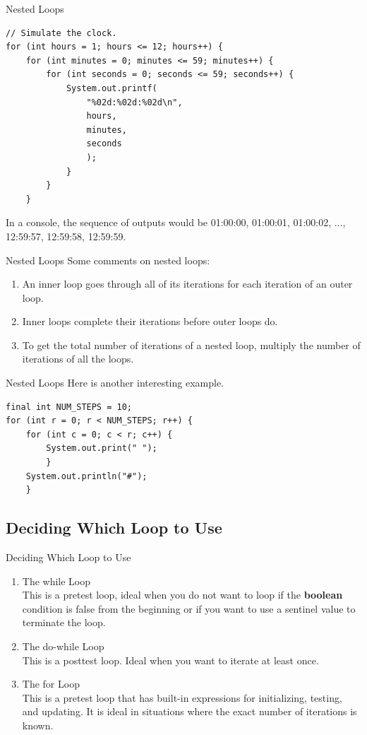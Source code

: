 \documentclass[11pt]{beamer}
\begin{document}
\begin{frame}[fragile]{Nested Loops}
    \begin{lstlisting}[basicstyle=\ttfamily\footnotesize]
// Simulate the clock.
for (int hours = 1; hours <= 12; hours++) {
    for (int minutes = 0; minutes <= 59; minutes++) {
        for (int seconds = 0; seconds <= 59; seconds++) {
            System.out.printf(
                "%02d:%02d:%02d\n", 
                hours,
                minutes, 
                seconds
                ); 
            }
        }
    }
    \end{lstlisting}
In a console, the sequence of outputs would be 01:00:00, 01:00:01, 01:00:02, ..., 12:59:57, 12:59:58, 12:59:59.
\end{frame}

\begin{frame}{Nested Loops}
    Some comments on nested loops:
    \begin{enumerate}
        \item An inner loop goes through all of its iterations for each iteration of an outer loop.
        \item Inner loops complete their iterations before outer loops do.
        \item To get the total number of iterations of a nested loop, multiply the number of iterations of all the loops.
    \end{enumerate}
\end{frame}

\begin{frame}[fragile]{Nested Loops}
Here is another interesting example.
\begin{lstlisting}
final int NUM_STEPS = 10;
for (int r = 0; r < NUM_STEPS; r++) {
    for (int c = 0; c < r; c++) {
        System.out.print(" ");
        }
    System.out.println("#");
    }
\end{lstlisting}
\end{frame}

\subsection{Deciding Which Loop to Use}
\begin{frame}{Deciding Which Loop to Use}
\begin{enumerate}
    \item The while Loop \\
    This is a pretest loop, ideal when you do not want to loop if the \textbf{boolean} condition is false from the beginning or if you want to use a sentinel value to terminate the loop.
    \item The do-while Loop \\ 
    This is a posttest loop. Ideal when you want to iterate at least once.
    \item The for Loop \\ 
    This is a pretest loop that has built-in expressions for initializing, testing, and updating. It is ideal in situations where the exact number of iterations is known.
\end{enumerate}
\end{frame}
\end{document}
